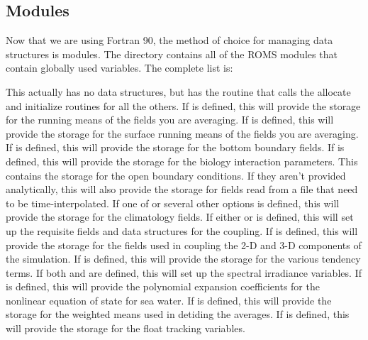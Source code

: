 \subsection{Modules}
\label{Mod_f90}
Now that we are using Fortran 90, the method of choice for managing
data structures is modules. The  directory
contains all of the ROMS modules that contain globally used
variables. The complete list is:
\begin{klist}
   This actually has no data structures, but has the
    routine that calls the allocate and initialize routines for all the
    others.
   If  is defined, this will
    provide the storage for the running means of the fields you are averaging.
   If  is defined, this will
    provide the storage for the surface running means of the fields you are
    averaging.
    If  is defined, this will
    provide the storage for the bottom boundary fields.
    If  is defined, this will
    provide the storage for the biology interaction parameters.
   This contains the storage for the open boundary
    conditions. If they aren't provided analytically, this will also provide
    the storage for fields read from a file that need to be time-interpolated.
    If one of 
    or several other options is defined, this will
    provide the storage for the climatology fields.
    If either   or
     is defined, this will set up the requisite fields and
    data structures for the coupling.
    If  is defined, this will
    provide the storage for the fields used in coupling the 2-D
    and 3-D components of the simulation.
    If  is defined, this will
    provide the storage for the various tendency terms.
    If both  and 
    are defined, this will set up the spectral irradiance
    variables.
    If  is defined, this will
    provide the polynomial expansion coefficients for the nonlinear equation
    of state for sea water.
   If  is defined, this will provide
    the storage for the weighted means used in detiding the averages.
   If  is defined, this will
    provide the storage for the float tracking variables.

\end{klist}
